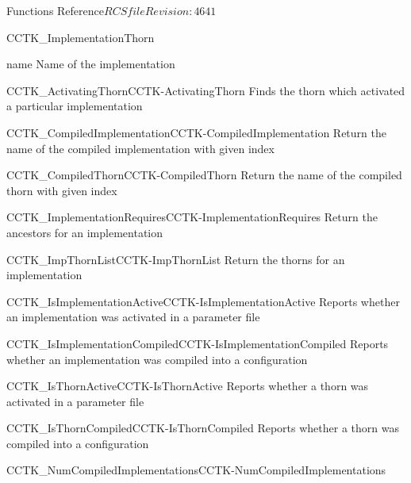 \begin{cactuspart}{ Functions Reference}{$RCSfile$}{$Revision: 4641 $}
\begin{FunctionDescription}{CCTK\_ImplementationThorn}
\begin{ParameterSection}
\begin{Parameter}{name}
Name of the implementation
\end{Parameter}
\end{ParameterSection}


\begin{SeeAlsoSection}
\begin{SeeAlso2}{CCTK\_ActivatingThorn}{CCTK-ActivatingThorn}
  Finds the thorn which activated a particular implementation
\end{SeeAlso2}
\begin{SeeAlso2}{CCTK\_CompiledImplementation}{CCTK-CompiledImplementation}
  Return the name of the compiled implementation with given index
\end{SeeAlso2}
\begin{SeeAlso2}{CCTK\_CompiledThorn}{CCTK-CompiledThorn}
  Return the name of the compiled thorn with given index
\end{SeeAlso2}
\begin{SeeAlso2}{CCTK\_ImplementationRequires}{CCTK-ImplementationRequires}
  Return the ancestors for an implementation
\end{SeeAlso2}
\begin{SeeAlso2}{CCTK\_ImpThornList}{CCTK-ImpThornList}
  Return the thorns for an implementation
\end{SeeAlso2}
\begin{SeeAlso2}{CCTK\_IsImplementationActive}{CCTK-IsImplementationActive}
  Reports whether an implementation was activated in a parameter file
\end{SeeAlso2}
\begin{SeeAlso2}{CCTK\_IsImplementationCompiled}{CCTK-IsImplementationCompiled}
  Reports whether an implementation was compiled into a configuration
\end{SeeAlso2}
\begin{SeeAlso2}{CCTK\_IsThornActive}{CCTK-IsThornActive}
  Reports whether a thorn was activated in a parameter file
\end{SeeAlso2}
\begin{SeeAlso2}{CCTK\_IsThornCompiled}{CCTK-IsThornCompiled}
  Reports whether a thorn was compiled into a configuration
\end{SeeAlso2}
\begin{SeeAlso2}{CCTK\_NumCompiledImplementations}{CCTK-NumCompiledImplementations}

\end{SeeAlso2}
\end{SeeAlsoSection}
\end{FunctionDescription}
\end{cactuspart}
